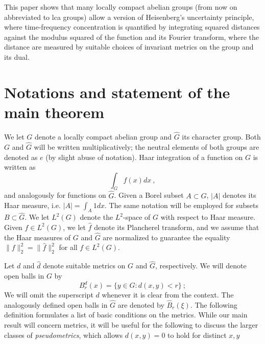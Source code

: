 \documentclass[12pt, reqno]{amsart}
\begin{document}
This paper shows that many locally compact abelian groups (from now on abbreviated to lca groups)  allow a version of Heisenberg's uncertainty principle, where time-frequency concentration is quantified by integrating squared distances against the modulus squared of the function and its Fourier transform, where the distance are measured by suitable choices of invariant metrics on the group and its dual. 

\section{Notations and statement of the main theorem}

We let $G$ denote a locally compact abelian group and $\widehat{G}$ its character group. Both $G$ and $\widehat{G}$ will be written multiplicatively; the neutral elements of both groups are denoted as $e$ (by slight abuse of notation). Haar integration of a function on $G$ is written as 
\[
\int_G f(x) dx~,
\] and analogously for functions on $\widehat{G}$. Given a Borel subset $A \subset G$, $|A|$ denotes its Haar measure, i.e. $|A| = \int_A 1 dx$. The same notation will be employed for subsets $ B \subset \widehat{G}$. We let $L^2(G)$ denote the $L^2$-space of $G$ with respect to Haar measure. Given $f \in L^2(G)$, we let $\widehat{f}$ denote its Plancherel transform, and we assume that the Haar measures of $G$ and $\widehat{G}$ are normalized to guarantee the equality $\| f \|_2^2 = \| \widehat{f} \|_2^2$ for all $f \in L^2(G)$. 

Let $d$ and $\widehat{d}$ denote suitable metrics on $G$ and $\widehat{G}$, respectively. We will denote open balls in $G$ by 
\[
B_r^d(x) = \{ y \in G : d(x,y) < r \}~;
\] We will omit the superscript $d$ whenever it is clear from the context. The analogously defined open balls in $\widehat{G}$ are denoted by $\widehat{B}_r(\xi)$.
The following definition formulates a list of basic conditions on the metrics. While our main result will concern metrics, it will be useful for the following to discuss the larger classes of \textit{pseudometrics}, which allows $d(x,y) = 0$ to hold for distinct $x,y$
\end{document}
